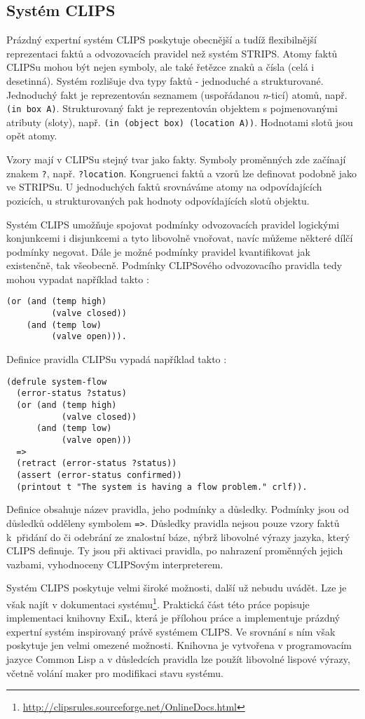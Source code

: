 \subsection{Systém CLIPS}

Prázdný expertní systém CLIPS poskytuje obecnější a tudíž flexibilnější
reprezentaci faktů a odvozovacích pravidel než systém STRIPS. Atomy faktů CLIPSu
mohou být nejen symboly, ale také řetězce znaků a čísla (celá i desetinná).
Systém rozlišuje dva typy faktů - jednoduché a strukturované. Jednoduchý fakt je
reprezentován seznamem (uspořádanou \emph{n}-ticí) atomů, např.
\verb|(in box A)|. Strukturovaný fakt je reprezentován objektem s pojmenovanými
atributy (sloty), např. \verb|(in (object box) (location A))|. Hodnotami slotů jsou
opět atomy.

Vzory mají v CLIPSu stejný tvar jako fakty. Symboly proměnných zde začínají
znakem \verb|?|, např. \verb|?location|. Kongruenci faktů a vzorů lze definovat
podobně jako ve STRIPSu. U jednoduchých faktů srovnáváme atomy na odpovídajících
pozicích, u strukturovaných pak hodnoty odpovídajících slotů objektu.

Systém CLIPS umožňuje spojovat podmínky odvozovacích pravidel logickými
konjunkcemi i disjunkcemi a tyto libovolně vnořovat, navíc můžeme některé dílčí
podmínky negovat. Dále je možné podmínky pravidel kvantifikovat jak existenčně,
tak všeobecně. Podmínky CLIPSového odvozovacího pravidla tedy mohou vypadat
například takto \cite{clips}:
\begin{verbatim}
(or (and (temp high)
         (valve closed))
    (and (temp low)
         (valve open))).
\end{verbatim}

Definice pravidla CLIPSu vypadá například takto \cite{clips}:
\begin{verbatim}
(defrule system-flow
  (error-status ?status)
  (or (and (temp high)
           (valve closed))
      (and (temp low)
           (valve open)))
  =>
  (retract (error-status ?status))
  (assert (error-status confirmed))
  (printout t "The system is having a flow problem." crlf)).
\end{verbatim}
Definice obsahuje název pravidla, jeho podmínky a důsledky. Podmínky jsou od
důsledků odděleny symbolem \verb|=>|. Důsledky pravidla nejsou pouze vzory faktů
k~přidání do či odebrání ze znalostní báze, nýbrž libovolné výrazy jazyka, který
CLIPS definuje. Ty jsou při aktivaci pravidla, po nahrazení proměnných jejich
vazbami, vyhodnoceny CLIPSovým interpreterem.

Systém CLIPS poskytuje velmi široké možnosti, další už nebudu uvádět. Lze je
však najít v dokumentaci
systému\footnote{\url{http://clipsrules.sourceforge.net/OnlineDocs.html}}.
Praktická část této práce popisuje implementaci knihovny ExiL, která je přílohou
práce a implementuje prázdný expertní systém inspirovaný právě systémem CLIPS.
Ve srovnání s ním však poskytuje jen velmi omezené možnosti. Knihovna je
vytvořena v programovacím jazyce Common Lisp a v důsledcích pravidla lze použít
libovolné lispové výrazy, včetně volání maker pro modifikaci stavu systému.
